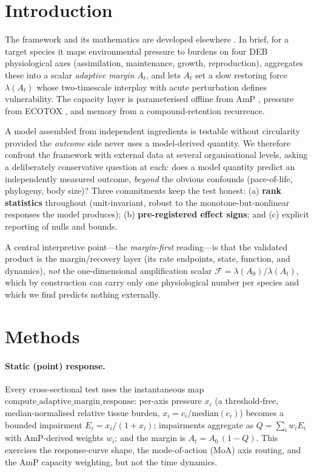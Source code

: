 \section{Introduction}
\label{sec:intro}

The framework and its mathematics are developed elsewhere \citep[the companion paper;
also][]{kooijman2010deb}. In brief, for a target species it maps environmental pressure to burdens on
four DEB physiological axes (assimilation, maintenance, growth, reproduction), aggregates these into a
scalar \emph{adaptive margin} $A_t$, and lets $A_t$ set a slow restoring force $\lambda(A_t)$ whose
two-timescale interplay with acute perturbation defines vulnerability. The capacity layer is
parameterised offline from AmP \citep{marques2018amp}, pressure from ECOTOX \citep{olker2022ecotox},
and memory from a compound-retention recurrence.

A model assembled from independent ingredients is testable without circularity provided the
\emph{outcome} side never uses a model-derived quantity. We therefore confront the framework with
external data at several organisational levels, asking a deliberately conservative question at each:
does a model quantity predict an independently measured outcome, \emph{beyond} the obvious confounds
(pace-of-life, phylogeny, body size)? Three commitments keep the test honest: (a) \textbf{rank
statistics} throughout (unit-invariant, robust to the monotone-but-nonlinear responses the model
produces); (b) \textbf{pre-registered effect signs}; and (c) explicit reporting of nulls and bounds.

A central interpretive point---the \emph{margin-first} reading---is that the validated product is the
margin/recovery layer (its rate endpoints, state, function, and dynamics), \emph{not} the
one-dimensional amplification scalar $\mathcal{F}=\lambda(A_0)/\lambda(A_t)$, which by construction can
carry only one physiological number per species and which we find predicts nothing externally.

\section{Methods}
\label{sec:methods}

\paragraph{Static (point) response.} Every cross-sectional test uses the instantaneous map
$\mathrm{compute\_adaptive\_margin\_response}$: per-axis pressure $x_i$ (a threshold-free,
median-normalised relative tissue burden, $x_i=c_i/\mathrm{median}(c_i)$) becomes a bounded impairment
$E_i = x_i/(1+x_i)$; impairments aggregate as $Q=\sum_i w_i E_i$ with AmP-derived weights $w_i$; and the
margin is $A_t = A_0\,(1-Q)$. This exercises the response-curve shape, the mode-of-action (MoA) axis
routing, and the AmP capacity weighting, but not the time dynamics.

